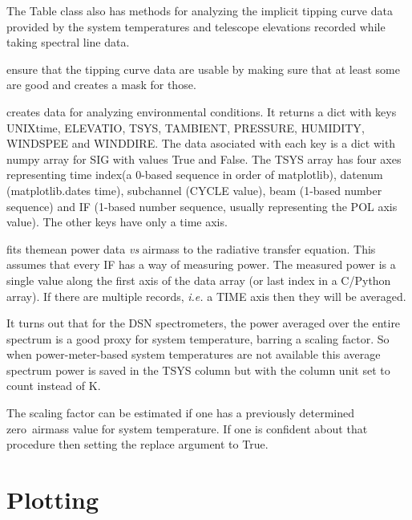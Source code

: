 \documentclass[letterpaper,11pt]{book}
\begin{document}
The {\ttfamily Table} class also has methods for analyzing the implicit tipping
curve data provided by the system temperatures and telescope elevations recorded
while taking spectral line data.
\begin{description}\itemsep0pt \parskip0pt 
\item[{\ttfamily validate\_wx\_data()}] ensure that the tipping curve data are 
usable by making sure that at least some are good and creates a mask for those.
\item[{\ttfamily get\_wx\_datacubes()}] creates data for analyzing environmental 
conditions. It returns a dict with keys {\ttfamily UNIXtime}, 
{\ttfamily ELEVATIO}, {\ttfamily TSYS}, {\ttfamily TAMBIENT}, 
{\ttfamily PRESSURE}, {\ttfamily HUMIDITY}, {\ttfamily WINDSPEE} and
{\ttfamily WINDDIRE}. The data asociated with each key is a dict with numpy 
array for {\ttfamily SIG} with values
{\ttfamily True} and {\ttfamily False}.  The {\ttfamily TSYS} array has four 
axes representing time index(a 0-based sequence in order of matplotlib), 
datenum ({\ttfamily matplotlib.dates} time), subchannel (CYCLE value), beam
(1-based number sequence) and IF (1-based number sequence, usually representing
the POL axis value). The other keys have only a time axis.
\item[{\ttfamily fit\_mean\_power\_to\_airmass(Tvac\_func, first=0, last=None,
replace=False)}] fits the\linebreak mean power data {\itshape vs} airmass to the 
radiative transfer equation. This assumes that every IF has a way of measuring 
power. The measured power is a single value along the first axis of the data 
array (or last index in a C/Python array).  If there are multiple records,
{\itshape i.e.} a {\ttfamily TIME} axis then they will be averaged.
\end{description}
It turns out that for the DSN spectrometers, the power averaged over the entire
spectrum is a good proxy for system temperature, barring a scaling factor. So
when power-meter-based system temperatures are not available this average 
spectrum power is saved in the {\ttfamily TSYS} column but with the column unit
set to {\ttfamily count} instead of {K}.

The scaling factor can be estimated if one has a previously determined 
zero~airmass value for system temperature. If one is confident about that
procedure then setting the {\ttfamily replace} argument to {\ttfamily True}.


\chapter{Plotting}\label{chap:plotting}
\end{document}
